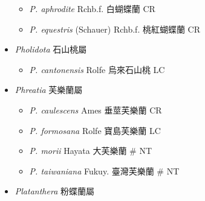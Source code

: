 \begin{itemize}
  \begin{itemize}
        \item[] \textit{P. aphrodite} Rchb.f.  白蝴蝶蘭   CR
        \item[] \textit{P. equestris} (Schauer) Rchb.f.  桃紅蝴蝶蘭   CR
  \end{itemize}
 \item[] \textit{Pholidota} 石山桃屬
                                
  \begin{itemize}
        \item[] \textit{P. cantonensis} Rolfe  烏來石山桃   LC
  \end{itemize}
 \item[] \textit{Phreatia} 芙樂蘭屬
                                
  \begin{itemize}
        \item[] \textit{P. caulescens} Ames  垂莖芙樂蘭   CR
        \item[] \textit{P. formosana} Rolfe  寶島芙樂蘭   LC
        \item[] \textit{P. morii} Hayata  大芙樂蘭  \# NT
        \item[] \textit{P. taiwaniana} Fukuy.  臺灣芙樂蘭  \# NT
  \end{itemize}
 \item[] \textit{Platanthera} 粉蝶蘭屬
                                

\end{itemize}
